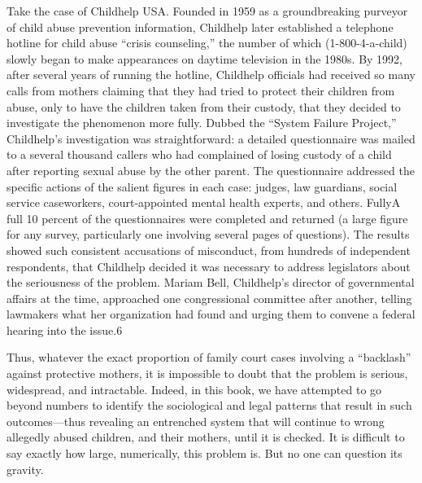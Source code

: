 Take the case of Childhelp USA. Founded in 1959 as a groundbreaking purveyor of child abuse prevention information, Childhelp later established a telephone hotline for child abuse “crisis counseling,” the number of which (1-800-4-a-child) slowly began to make appearances on daytime television in the 1980s. By 1992, after several years of running the hotline, Childhelp officials had received so many calls from mothers claiming that they had tried to protect their children from abuse, only to have the children taken from their custody, that they decided to investigate the phenomenon more fully. Dubbed the “System Failure Project,” Childhelp’s investigation was straightforward: a detailed questionnaire was mailed to a several thousand callers who had complained of losing custody of a child after reporting sexual abuse by the other parent. The questionnaire addressed the specific actions of the salient figures in each case: judges, law guardians, social service caseworkers, court-appointed mental health experts, and others. FullyA full 10 percent of the questionnaires were completed and returned (a large figure for any survey, particularly one involving several pages of questions). The results showed such consistent accusations of misconduct, from hundreds of independent respondents, that Childhelp decided it was necessary to address legislators about the seriousness of the problem. Mariam Bell, Childhelp’s director of governmental affairs at the time, approached one congressional committee after another, telling lawmakers what her organization had found and urging them to convene a federal hearing into the issue.6 \pfl{}


Thus, whatever the exact proportion of family court cases involving a “backlash” against protective mothers, it is impossible to doubt that the problem is serious, widespread, and intractable. Indeed, in this book, we have attempted to go beyond numbers to identify the sociological and legal patterns that result in such outcomes—thus revealing an entrenched system that will continue to wrong allegedly abused children, and their mothers, until it is checked. It is difficult to say exactly how large, numerically, this problem is. But no one can question its gravity. \pfl{}


